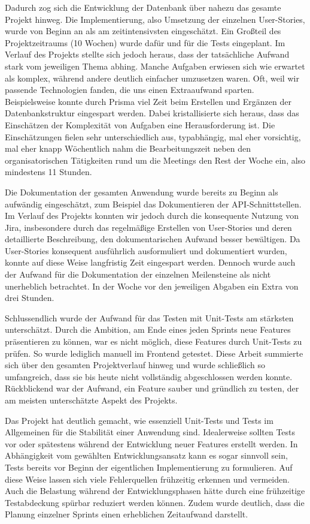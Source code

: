 \documentclass[a4paper,12pt]{article}
\begin{document}
Dadurch zog sich die Entwicklung der Datenbank über nahezu das gesamte Projekt hinweg. Die Implementierung, also Umsetzung der einzelnen User-Stories, wurde von Beginn an als am zeitintensivsten eingeschätzt. Ein Großteil des Projektzeitraums (10 Wochen) wurde dafür und für die Tests eingeplant. Im Verlauf des Projekts stellte sich jedoch heraus, dass der tatsächliche Aufwand stark vom jeweiligen Thema abhing. Manche Aufgaben erwiesen sich wie erwartet als komplex, während andere deutlich einfacher umzusetzen waren. Oft, weil wir passende Technologien fanden, die uns einen Extraaufwand sparten. Beispielsweise konnte durch Prisma viel Zeit beim Erstellen und Ergänzen der Datenbankstruktur eingespart werden. Dabei kristallisierte sich heraus, dass das Einschätzen der Komplexität von Aufgaben eine Herausforderung ist. Die Einschätzungen fielen sehr unterschiedlich aus, typabhängig, mal eher vorsichtig, mal eher knapp Wöchentlich nahm die Bearbeitungszeit neben den organisatorischen Tätigkeiten rund um die Meetings den Rest der Woche ein, also mindestens 11 Stunden.

Die Dokumentation der gesamten Anwendung wurde bereits zu Beginn als aufwändig eingeschätzt, zum Beispiel das Dokumentieren der API-Schnittstellen. Im Verlauf des Projekts konnten wir jedoch durch die konsequente Nutzung von Jira, insbesondere durch das regelmäßige Erstellen von User-Stories und deren detaillierte Beschreibung, den dokumentarischen Aufwand besser bewältigen. Da User-Stories konsequent ausführlich ausformuliert und dokumentiert wurden, konnte auf diese Weise langfristig Zeit eingespart werden. Dennoch wurde auch der Aufwand für die Dokumentation der einzelnen Meilensteine als nicht unerheblich betrachtet. In der Woche vor den jeweiligen Abgaben ein Extra von drei Stunden.

Schlussendlich wurde der Aufwand für das Testen mit \gls{Unit-Tests} am stärksten unterschätzt. Durch die Ambition, am Ende eines jeden Sprints neue Features präsentieren zu können, war es nicht möglich, diese Features durch Unit-Tests zu prüfen. So wurde lediglich manuell im Frontend getestet. Diese Arbeit summierte sich über den gesamten Projektverlauf hinweg und wurde schließlich so umfangreich, dass sie bis heute nicht vollständig abgeschlossen werden konnte. Rückblickend war der Aufwand, ein Feature sauber und gründlich zu testen, der am meisten unterschätzte Aspekt des Projekts.

\newpage

Das Projekt hat deutlich gemacht, wie essenziell Unit-Tests und Tests im Allgemeinen für die Stabilität einer Anwendung sind. Idealerweise sollten Tests vor oder spätestens während der Entwicklung neuer Features erstellt werden. In Abhängigkeit vom gewählten Entwicklungsansatz kann es sogar sinnvoll sein, Tests bereits vor Beginn der eigentlichen Implementierung zu formulieren. Auf diese Weise lassen sich viele Fehlerquellen frühzeitig erkennen und vermeiden. Auch die Belastung während der Entwicklungsphasen hätte durch eine frühzeitige Testabdeckung spürbar reduziert werden können. Zudem wurde deutlich, dass die Planung einzelner Sprints einen erheblichen Zeitaufwand darstellt.
\end{document}
